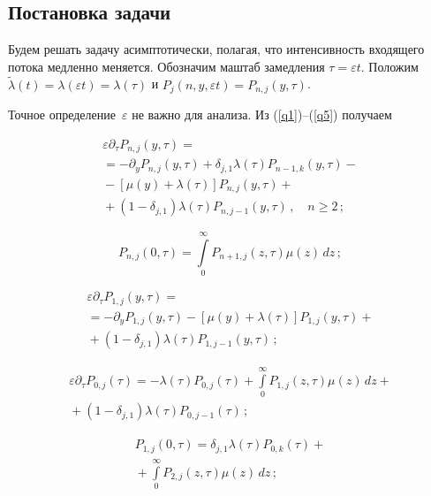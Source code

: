 \begin{multicols}{2}
\section{Постановка задачи}

Будем решать  задачу асимптотически, полагая, что интенсивность
входящего потока медленно меняется. Обозначим маштаб замедления
$\tau=\varepsilon t$.  Положим
$\widetilde{\lambda}(t)=\lambda(\varepsilon t)=\lambda(\tau)$
и
$
P_{j}(n,y,\varepsilon t)=P_{n,j}(y,\tau)$.

Точное определение~$\varepsilon$ не важно для анализа.
Из (\ref{q1})--(\ref{q5})  получаем

\noindent
\begin{multline}
\varepsilon\partial_{\tau}P_{n,j}(y,\tau)={}\\
{}= -\partial_{y}P_{n,j}(y,\tau)+
\delta_{j,1}\lambda(\tau)P_{n-1,k}(y,\tau)- {} \\
{}-\left [\mu(y)+\lambda(\tau)\right]P_{n,j}(y,\tau)+{}\\
{}+
(1-\delta_{j,1})\lambda(\tau)P_{n,j-1}(y,\tau)\,, \quad n\geq2\,;
\label{q6}
\end{multline}

\vspace*{-12pt}

\noindent
\begin{equation}
P_{n,j}(0,\tau)=\int\limits_{0}^\infty P_{n+1,j}(z,\tau)\mu(z)\,dz\,;
\label{q7}
\end{equation}

\vspace*{-12pt}

\noindent
\begin{multline}
\varepsilon\partial_{\tau}P_{1,j}(y,\tau)={}\\
{}=-\partial_{y}P_{1,j}(y,\tau)-\left[\mu(y)+\lambda(\tau)\right]P_{1,j}(y,\tau)+{} \\
{}+(1-\delta_{j,1})\lambda(\tau)P_{1,j-1}(y,\tau)\,;
\label{q8}
\end{multline}

\vspace*{-12pt}

\noindent
\begin{multline}
\varepsilon\partial_{\tau}P_{0,j}(\tau)=-\lambda(\tau)P_{0,j}(\tau)+\int\limits_{0}^{\infty}P_{1,j}(z,\tau)\mu(z)\,dz+{} \\
{}+(1-\delta_{j,1})\lambda(\tau)P_{0,j-1}(\tau)\,;
\label{q9}
\end{multline}

\vspace*{-12pt}
\noindent
\begin{multline}
P_{1,j}(0,\tau)=\delta_{j,1}\lambda(\tau)P_{0,k}(\tau)+{}\\
{}+\int\limits_{0}^{\infty}P_{2,j}(z,\tau)\mu(z)\,dz\,;
\label{q10}
\end{multline}


\end{multicols}
